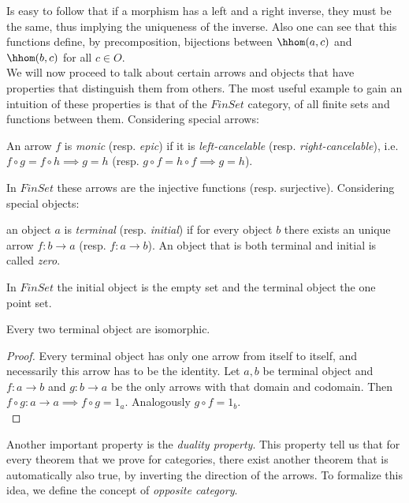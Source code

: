 Is easy to follow that if a morphism has a left and a right inverse, they must be the same, thus implying the uniqueness of the inverse. Also one can see that this functions define, by precomposition, bijections between $\hhom(a,c)$ and $\hhom(b,c)$ for all $c\in O$.\\

We will now proceed to talk about certain arrows and objects that have properties that distinguish them from others.  The most useful example to gain an intuition of these properties is that of the $FinSet$ category, of all finite sets and functions between them.  Considering special arrows:\\

\begin{definition} An arrow $f$ is  \emph{monic} (resp. \emph{epic}) if it is \emph{left-cancelable} (resp. \emph{right-cancelable}), i.e.  $f\circ g = f \circ h \implies g = h$ (resp. $g\circ f = h \circ f \implies g = h$).
\end{definition}



In $FinSet$ these arrows are the injective functions (resp. surjective). Considering special objects:

\begin{definition}
  an object $a$ is \emph{terminal} (resp. \emph{initial}) if for every object $b$ there exists an unique arrow $f:b\to a$ (resp. $f:a\to b$).  An object that is both terminal and initial is called \emph{zero}.
\end{definition}

In $FinSet$ the initial object is the  empty set and the terminal object the one point set.

\begin{proposition}\label{terminal-proposition}
  Every two terminal object are isomorphic.
\end{proposition}
\begin{proof}
  Every terminal object has only one arrow from itself to itself, and necessarily this arrow has to be the identity. Let $a, b$ be terminal object and $f:a\to b$ and $g:b\to a$ be the only arrows with that domain and codomain. Then $f\circ g : a \to a \implies f \circ g = 1_a$. Analogously $g \circ f = 1_b$.\\
\end{proof}

Another important property is the \emph{duality property}. This property tell us that for every theorem that we prove for categories, there exist another theorem that is automatically also true, by inverting the direction of the arrows. To formalize this idea, we define the concept of \emph{opposite category}.


